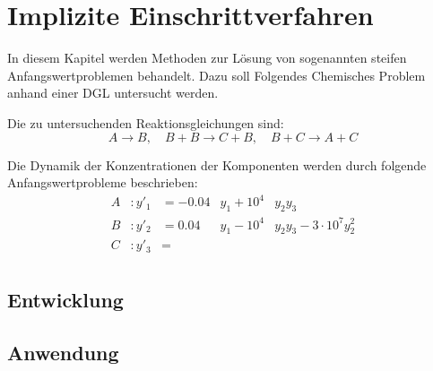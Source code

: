 \chapter{Implizite Einschrittverfahren}
In diesem Kapitel werden Methoden zur Lösung von sogenannten steifen Anfangswertproblemen behandelt. 
Dazu soll Folgendes Chemisches Problem anhand einer DGL untersucht werden.

Die zu untersuchenden Reaktionsgleichungen sind:
\begin{equation}
	A\rightarrow B, \quad B+B \rightarrow C+B, \quad B+C\rightarrow A+C
\end{equation}

Die Dynamik der Konzentrationen der Komponenten werden durch folgende Anfangswertprobleme beschrieben:
\begin{align*}
	A&:y'_1&=-0.04 & y_1+10^4 & y_2y_3\\
	B&:y'_2&=0.04 & y_1-10^4 & y_2y_3-3\cdot 10^7y_2^2\\
	C&:y'_3&=\\
\end{align*}

\section{Entwicklung}
\section{Anwendung}



